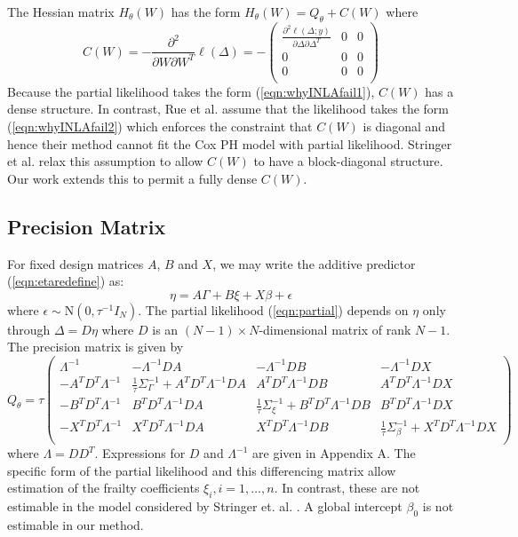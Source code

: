 \documentclass[num-refs,serif,10pt]{wiley-article}
\begin{document}
The Hessian matrix $H_{\theta}(W)$ has the form $H_{\theta}(W) = Q_{\theta} + C(W)$ where
\begin{equation*}
C(W) = -\frac{\partial^{2}}{\partial W\partial W^{T}}\ell(\Delta) = -\begin{pmatrix}
\frac{\partial^{2}\ell(\Delta;y)}{\partial\Delta\partial\Delta^{T}} & 0 & 0 \\
0 & 0 & 0 \\
0 & 0 & 0 \\
\end{pmatrix}
\end{equation*}
Because the partial likelihood takes the form (\ref{eqn:whyINLAfail1}), $C(W)$ has a dense structure. In contrast, Rue et al. \cite{inla} assume that the likelihood takes the form (\ref{eqn:whyINLAfail2}) which enforces the constraint that $C(W)$ is diagonal and hence their method cannot fit the Cox PH model with partial likelihood. Stringer et al. \cite{casecross} relax this assumption to allow $C(W)$ to have a block-diagonal structure. Our work extends this to permit a fully dense $C(W)$. 

\subsection{Precision Matrix}\label{subsec:Q}
For fixed design matrices $A$, $B$ and $X$, we may write the additive predictor (\ref{eqn:etaredefine}) as:
\begin{equation}
\eta = A\Gamma + B\xi + X\beta + \epsilon
\end{equation}
where $\epsilon \sim \text{N}\left( 0,\tau^{-1}I_{N}\right)$. The partial likelihood (\ref{eqn:partial}) depends on $\eta$ only through $\Delta = D\eta$ where $D$ is an $(N -1) \times N $-dimensional matrix of rank $N -1$. The precision matrix is given by
\begin{equation}\label{eqn:precmat}
Q_{\theta} = \tau\begin{pmatrix}
\Lambda^{-1} & -\Lambda^{-1}DA & -\Lambda^{-1}DB & - \Lambda^{-1}DX \\
- A^{T}D^{T}\Lambda^{-1} & \frac{1}{\tau}\Sigma_{\Gamma}^{-1} +  A^{T}D^{T}\Lambda^{-1}DA &  A^{T}D^{T}\Lambda^{-1}DB &  A^{T}D^{T}\Lambda^{-1}DX \\
- B^{T}D^{T}\Lambda^{-1} &  B^{T}D^{T}\Lambda^{-1}DA & \frac{1}{\tau}\Sigma_{\xi}^{-1} +  B^{T}D^{T}\Lambda^{-1}DB & B^{T}D^{T}\Lambda^{-1}DX \\
- X^{T}D^{T}\Lambda^{-1} &  X^{T}D^{T}\Lambda^{-1}DA & X^{T}D^{T}\Lambda^{-1}DB & \frac{1}{\tau}\Sigma_{\beta}^{-1} +  X^{T}D^{T}\Lambda^{-1}DX \\
\end{pmatrix}
\end{equation}
where $\Lambda = DD^{T}$. Expressions for $D$ and $\Lambda^{-1}$ are given in Appendix A. The specific form of the partial likelihood and this differencing matrix allow estimation of the frailty coefficients $\xi_{i},i = 1,\ldots,n$. In contrast, these are not estimable in the model considered by Stringer et. al. \cite{casecross}. A global intercept $\beta_{0}$ is not estimable in our method.
\end{document}
